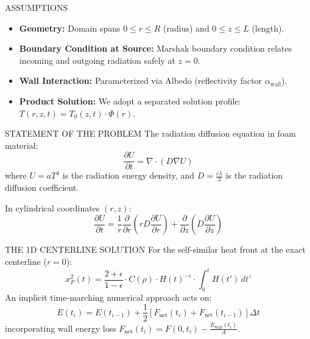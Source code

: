\documentclass{beamer}
\begin{document}
\begin{frame}{ASSUMPTIONS}
  \begin{itemize}
    \item \textbf{Geometry:} Domain spans $0 \leq r \leq R$ (radius) and $0 \leq z \leq L$ (length).
    \item \textbf{Boundary Condition at Source:} Marshak boundary condition relates incoming and outgoing radiation safely at $z=0$. 
    \item \textbf{Wall Interaction:} Parameterized via Albedo (reflectivity factor $\alpha_{\text{wall}}$).
    \item \textbf{Product Solution:} We adopt a separated solution profile: $T(r,z,t) = T_0(z,t) \cdot \Phi(r)$.
  \end{itemize}
\end{frame}

\begin{frame}{STATEMENT OF THE PROBLEM}
  The radiation diffusion equation in foam material:
  \begin{equation}
    \frac{\partial U}{\partial t} = \nabla \cdot (D \nabla U)
  \end{equation}
  where $U = a T^4$ is the radiation energy density, and $D = \frac{c\lambda}{3}$ is the radiation diffusion coefficient.

  \vspace{10pt}
  In cylindrical coordinates $(r, z)$:
  \begin{equation}
    \frac{\partial U}{\partial t} = \frac{1}{r}\frac{\partial}{\partial r}\left(r D \frac{\partial U}{\partial r}\right) + \frac{\partial}{\partial z}\left(D \frac{\partial U}{\partial z}\right)
  \end{equation}
\end{frame}

\begin{frame}{THE 1D CENTERLINE SOLUTION}
  For the self-similar heat front at the exact centerline ($r=0$):
  \begin{equation}
    x_F^2(t) = \frac{2+\epsilon}{1-\epsilon} \cdot C(\rho) \cdot H(t)^{-\epsilon} \cdot \int_0^t H(t') \, dt'
  \end{equation}
  An implicit time-marching numerical approach acts on:
  \begin{equation}
    E(t_i) = E(t_{i-1}) + \frac{1}{2}\left[F_{\text{net}}(t_i) + F_{\text{net}}(t_{i-1})\right] \Delta t
  \end{equation}
  incorporating wall energy loss $F_{\text{net}}(t_i) = F(0, t_i) - \frac{\dot{E}_{\text{wall}}(t_i)}{A}$.
\end{frame}
\end{document}
